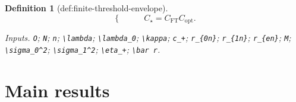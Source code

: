 \documentclass{article}
\newtheorem{definition}{Definition}
\begin{document}
\begin{definition}[def:finite-threshold-envelope]
\[\begin{cases}
\end{cases}
\qquad
C_\star=C_{\mathrm{FT}}C_{\mathrm{opt}}.
\]
\par\smallskip\noindent\emph{Inputs.} \texttt{O}; \texttt{N}; \texttt{n}; \texttt{\textbackslash{}\allowbreak{}lambda}; \texttt{\textbackslash{}\allowbreak{}lambda\_\allowbreak{}0}; \texttt{\textbackslash{}\allowbreak{}kappa}; \texttt{c\_\allowbreak{}+\allowbreak{}}; \texttt{r\_\allowbreak{}\{0n\}\allowbreak{}}; \texttt{r\_\allowbreak{}\{1n\}\allowbreak{}}; \texttt{r\_\allowbreak{}\{en\}\allowbreak{}}; \texttt{M}; \texttt{\textbackslash{}\allowbreak{}sigma\_\allowbreak{}0\textasciicircum{}2}; \texttt{\textbackslash{}\allowbreak{}sigma\_\allowbreak{}1\textasciicircum{}2}; \texttt{\textbackslash{}\allowbreak{}eta\_\allowbreak{}+\allowbreak{}}; \texttt{\textbackslash{}\allowbreak{}bar r}.
\end{definition}

\section{Main results}
\end{document}
